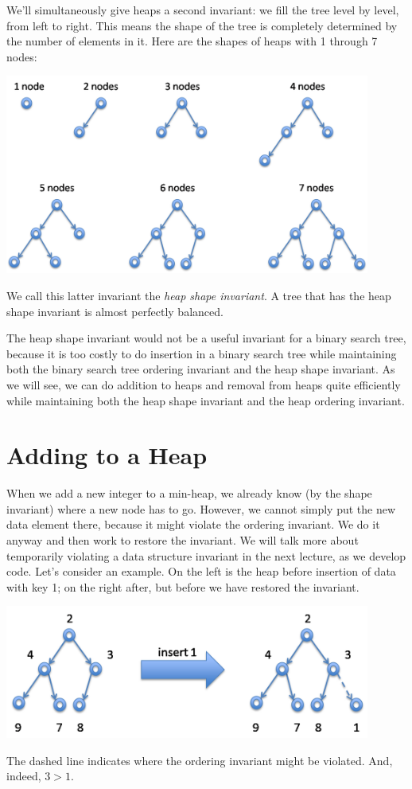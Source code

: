 We'll simultaneously give heaps a second invariant:
we fill the tree level by level, from left to right.  This
means the shape of the tree is completely determined by the number
of elements in it.  Here are the shapes of heaps with 1 through 7
nodes:
\begin{center}
  \includegraphics[width=0.9\textwidth]{img/heap1.png}
\end{center}
We call this latter invariant the \emph{heap shape invariant}.  A tree
that has the heap shape invariant is almost perfectly balanced.

The heap shape invariant would not be a useful invariant for a binary
search tree, because it is too costly to do insertion in a binary
search tree while maintaining both the binary search tree ordering
invariant and the heap shape invariant.  As we will see, we can do
addition to heaps and removal from heaps quite efficiently while maintaining
both the heap shape invariant and the heap ordering invariant.

\section{Adding to a Heap}
\label{sec:pq:inserting}

When we add a new integer to a min-heap, we already know (by the shape
invariant) where a new node has to go.  However, we cannot simply put
the new data element there, because it might violate the ordering
invariant.  We do it anyway and then work to restore the invariant.
We will talk more about temporarily violating a data structure
invariant in the next lecture, as we develop code.  Let's consider an
example.  On the left is the heap before insertion of data with key 1;
on the right after, but before we have restored the invariant.
\begin{center}
  \includegraphics[width=0.9\textwidth]{img/insert1.png}
\end{center}
The dashed line indicates where the ordering invariant might
be violated.  And, indeed, $3 > 1$.

